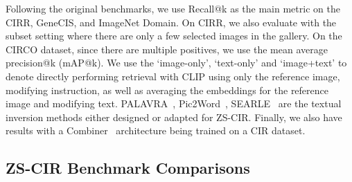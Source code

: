 \documentclass{article} \usepackage{iclr2024_conference,times}
\begin{document}
Following the original benchmarks, we use Recall@k as the main metric on the CIRR, GeneCIS, and ImageNet Domain. On CIRR, we also  evaluate with the subset setting where there are only a few selected images in the gallery. On the CIRCO dataset, since there are multiple positives, we use the mean average precision@k (mAP@k). We use the `image-only', `text-only' and `image+text' to denote directly performing retrieval with CLIP using only the reference image, modifying instruction, as well as averaging the embeddings for the reference image and modifying text. PALAVRA~\citep{palavra}, Pic2Word~\citep{pic2word}, SEARLE~\citep{searle} are the textual inversion methods either designed or adapted for ZS-CIR. Finally, we also have results with a Combiner~\citep{combiner} architecture being trained on a CIR dataset. 

\subsection{ZS-CIR Benchmark Comparisons}
\label{subsec:benchmarks}
\end{document}
